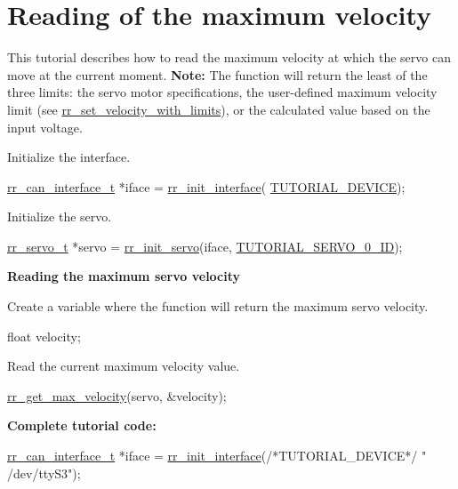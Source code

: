 \hypertarget{group__tutor__c__get__max__velocity}{}\section{Reading of the maximum velocity}
\label{group__tutor__c__get__max__velocity}
This tutorial describes how to read the maximum velocity at which the servo can move at the current moment. {\bfseries  Note\+: } The function will return the least of the three limits\+: the servo motor specifications, the user-\/defined maximum velocity limit (see \hyperlink{group___motion_ga252ba86c50217d9ccf08deaf4c75f2e7}{rr\+\_\+set\+\_\+velocity\+\_\+with\+\_\+limits}), or the calculated value based on the input voltage.


\begin{DoxyEnumerate}
\item Initialize the interface. 
\begin{DoxyCodeInclude}
    \hyperlink{structrr__can__interface__t}{rr\_can\_interface\_t} *iface = \hyperlink{group___init_ga472a4890dcc7d7a13123c56a06946d91}{rr\_init\_interface}(
      \hyperlink{tutorial_8h_a90947332a0345dc693905e3fc04dbeb2}{TUTORIAL\_DEVICE});
\end{DoxyCodeInclude}

\item Initialize the servo. 
\begin{DoxyCodeInclude}
    \hyperlink{structrr__servo__t}{rr\_servo\_t} *servo = \hyperlink{group___init_ga0adb313a3eeb8a4399431e940a1f3e9e}{rr\_init\_servo}(iface, 
      \hyperlink{tutorial_8h_a9a3d33f25d3a72a8e30c885d238b3b65}{TUTORIAL\_SERVO\_0\_ID});
\end{DoxyCodeInclude}
 {\bfseries  Reading the maximum servo velocity }
\item Create a variable where the function will return the maximum servo velocity. 
\begin{DoxyCodeInclude}
    \textcolor{keywordtype}{float} velocity;
\end{DoxyCodeInclude}

\item Read the current maximum velocity value. 
\begin{DoxyCodeInclude}
    \hyperlink{group___config_gad388cd353b262b614b563b093d61c911}{rr\_get\_max\_velocity}(servo, &velocity);
\end{DoxyCodeInclude}
 {\bfseries  Complete tutorial code\+: } 
\begin{DoxyCodeInclude}
    \hyperlink{structrr__can__interface__t}{rr\_can\_interface\_t} *iface = \hyperlink{group___init_ga472a4890dcc7d7a13123c56a06946d91}{rr\_init\_interface}(\textcolor{comment}{/*TUTORIAL\_DEVICE*/} \textcolor{stringliteral}{"
      /dev/ttyS3"});


\end{DoxyCodeInclude}
\end{DoxyEnumerate}
